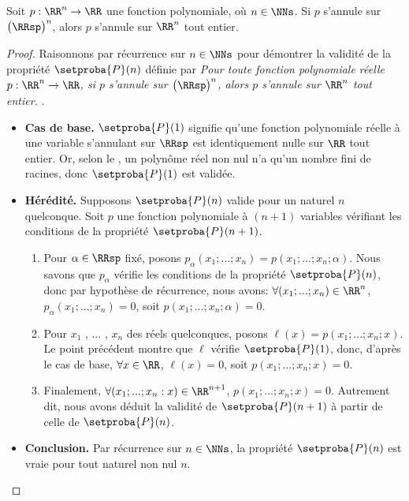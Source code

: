 

\begin{fact} \label{poly-nullity-pos}
	Soit $p: \RR^n \rightarrow \RR$ une fonction polynomiale, où $n \in \NNs$.
	Si $p$ s'annule sur $\big( \RRsp \big)^n$, alors $p$ s'annule sur $\RR^n$ tout entier. 
\end{fact}


\begin{proof}
	Raisonnons par récurrence sur $n \in \NNs$ pour démontrer la validité de la propriété $\setproba{P}(n)$ définie par
	\emph{\og 
		Pour toute fonction polynomiale réelle $p: \RR^n \rightarrow \RR$,
		si $p$ s'annule sur $\big( \RRsp \big)^n$,
		alors $p$ s'annule sur $\RR^n$ tout entier. 
	\fg}\kern2pt.
	\begin{itemize}[label=\small\textbullet]
		\item \textbf{Cas de base.}
		$\setproba{P}(1)$ signifie qu'une fonction polynomiale réelle à une variable s'annulant sur $\RRsp$ est identiquement nulle sur $\RR$ tout entier.
		Or, selon le , un polynôme réel non nul n'a qu'un nombre fini de racines, donc $\setproba{P}(1)$ est validée.


		\item \textbf{Hérédité.}
		Supposons $\setproba{P}(n)$ valide pour un naturel $n$ quelconque.
		Soit $p$ une fonction polynomiale à $(n + 1)$ variables vérifiant les conditions de la propriété $\setproba{P}(n + 1)$.
		\begin{enumerate}
		    \item Pour $\alpha \in \RRsp$ fixé,
		    posons $p_\alpha(x_1 ; ... ; x_n) = p(x_1 ; ... ; x_n ; \alpha)$.
		    Nous savons que $p_\alpha$ vérifie les conditions de la propriété $\setproba{P}(n)$,
		    donc par hypothèse de récurrence, nous avons:
		    $\forall (x_1 ; ... ; x_n) \in \RR^n$,
		    $p_\alpha(x_1 ; ... ; x_n) = 0$,
		    soit $p(x_1 ; ... ; x_n ; \alpha) = 0$.


		    \item Pour $x_1$ , ... , $x_n$ des réels quelconques,
		    posons $\ell(x) = p(x_1 ; ... ; x_n ; x)$.
		    Le point précédent montre que $\ell$ vérifie $\setproba{P}(1)$, donc, d'après le cas de base,
		    $\forall x \in \RR$,
		    $\ell(x) = 0$,
		    soit $p(x_1 ; ... ; x_n ; x) = 0$.


		    \item Finalement,
		    $\forall (x_1 ; ... ; x_n : x) \in \RR^{n+1}$,
		    $p(x_1 ; ... ; x_n ; x) = 0$.
		    Autrement dit, nous avons déduit la validité de $\setproba{P}(n+1)$ à partir de celle de $\setproba{P}(n)$.
		\end{enumerate}
		
		
		\item \textbf{Conclusion.}
		Par récurrence sur $n \in \NNs$, la propriété $\setproba{P}(n)$ est vraie pour tout naturel non nul $n$.
	\end{itemize}

	\null\vspace{-6ex}
\end{proof}


